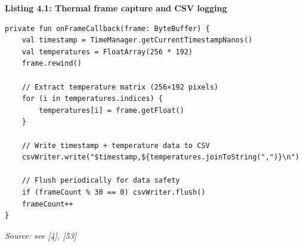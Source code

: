 \documentclass[12pt,a4paper]{article}
\begin{document}
\textbf{Listing 4.1: Thermal frame capture and CSV logging}

\begin{lstlisting}
private fun onFrameCallback(frame: ByteBuffer) {
    val timestamp = TimeManager.getCurrentTimestampNanos()
    val temperatures = FloatArray(256 * 192)
    frame.rewind()
    
    // Extract temperature matrix (256×192 pixels)
    for (i in temperatures.indices) {
        temperatures[i] = frame.getFloat()
    }
    
    // Write timestamp + temperature data to CSV
    csvWriter.write("$timestamp,${temperatures.joinToString(",")}\n")
    
    // Flush periodically for data safety
    if (frameCount % 30 == 0) csvWriter.flush()
    frameCount++
}
\end{lstlisting}

\emph{Source: see {[}4{]}, {[}53{]}}
\end{document}
